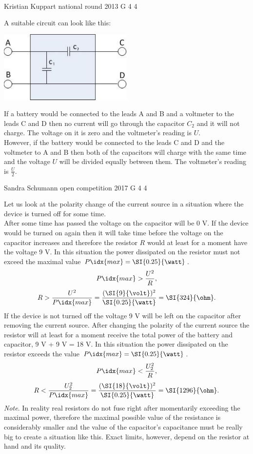 \documentclass[11pt]{article}
\begin{document}
{Kristian Kuppart} %
{national round} %
{2013} %
{G 4} %
{4} %
{

\ifEngSolution
A suitable circuit can look like this:
\begin{center}
\includegraphics[width=0.5\textwidth]{2013-v3g-04-mustkastlah}\\
\end{center}
If a battery would be connected to the leads A and B and a voltmeter to the leads C and D then no current will go through the capacitor $C_2$ and it will not charge. The voltage on it is zero and the voltmeter’s reading is $U$.\\
However, if the battery would be connected to the leads C and D and the voltmeter to A and B then both of the capacitors will charge with the same time and the voltage $U$ will be divided equally between them. The voltmeter’s reading is $\frac{U}{2}$.
\fi
}

{Sandra Schumann} %
{open competition} %
{2017} %
{G 4} %
{4} %
{

\ifEngSolution
Let us look at the polarity change of the current source in a situation where the device is turned off for some time.\\
After some time has passed the voltage on the capacitor will be 0 V. If the device would be turned on again then it will take time before the voltage on the capacitor increases and therefore the resistor $R$ would at least for a moment have the voltage 9 V. In this situation the power dissipated on the resistor must not exceed the maximal value $P\idx{max} = \SI{0.25}{\watt}$. 
\[P\idx{max} > \frac{U^2}{R},\] 
\[R > \frac{U^2}{P\idx{max}} = \frac{(\SI{9}{\volt})^2}{\SI{0.25}{\watt}} = \SI{324}{\ohm}. \]
If the device is not turned off the voltage 9 V will be left on the capacitor after removing the current source. After changing the polarity of the current source the resistor will at least for a moment receive the total power of the battery and capacitor, 9 V + 9 V = 18 V. In this situation the power dissipated on the resistor exceeds the value $P\idx{max} = \SI{0.25}{\watt}$. 
\[P\idx{max} < \frac{U_2^2}{R},\] 
\[R < \frac{U_2^2}{P\idx{max}} = \frac{(\SI{18}{\volt})^2}{\SI{0.25}{\watt}} = \SI{1296}{\ohm}. \]
\emph{Note}. In reality real resistors do not fuse right after momentarily exceeding the maximal power, therefore the maximal possible value of the resistance is considerably smaller and the value of the capacitor’s capacitance must be really big to create a situation like this. Exact limits, however, depend on the resistor at hand and its quality.
\fi
}
\end{document}
